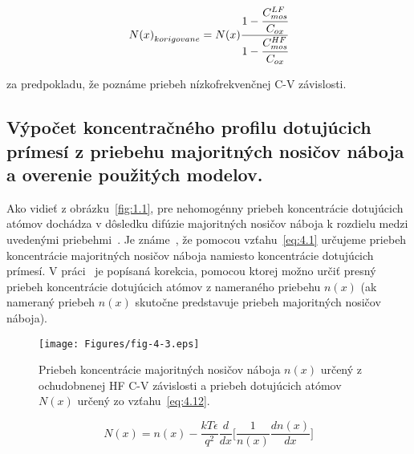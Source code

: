 \begin{equation}\label{eq:4.11}
  {N(x)}_{korigovane} = {N(x)}{\cfrac{1-\cfrac{C_{mos}^{LF}}{C_{ox}}}{1-\cfrac{C_{mos}^{HF}}{C_{ox}}}}
\end{equation}

za predpokladu, že poznáme priebeh nízkofrekvenčnej C-V závislosti.


\subsection[Výpočet koncentračného profilu dotujúcich prímesí z priebehu majoritných nosičov náboja a overenie použitých modelov.]{Výpočet koncentračného profilu dotujúcich prímesí z priebehu majoritných nosičov náboja a overenie použitých modelov.}\label{sec:4.1.4}

Ako vidieť z obrázku~\ref{fig:1.1}, pre nehomogénny priebeh
koncentrácie dotujúcich atómov dochádza v dôsledku difúzie majoritných
nosičov náboja k rozdielu medzi uvedenými priebehmi~\cite{4.16}. Je
známe~\cite{4.17}, že pomocou vzťahu~\ref{eq:4.1} určujeme priebeh
koncentrácie majoritných nosičov náboja namiesto koncentrácie
dotujúcich prímesí. V práci~\cite{4.18} je popísaná korekcia, pomocou
ktorej možno určiť presný priebeh koncentrácie dotujúcich atómov z
nameraného priebehu $n(x)$ (ak nameraný priebeh $n(x)$ skutočne
predstavuje priebeh majoritných nosičov náboja).

\begin{figure}[h!]\centering
  \begin{minipage}[c]{\myfiguresize}
    \begin{center}
      \texttt{[image: Figures/fig-4-3.eps]}
      \caption[Priebeh koncentrácie majoritných nosičov náboja $n(x)$
        určený z ochudobnenej HF C-V závislosti a priebeh dotujúcich
        atómov $N(x)$ určený zo vzťahu~\ref{eq:4.12}]{Priebeh
        koncentrácie majoritných nosičov náboja $n(x)$ určený z
        ochudobnenej HF C-V závislosti a priebeh dotujúcich atómov
        $N(x)$ určený zo vzťahu~\ref{eq:4.12}.}\label{fig:4.3}
    \end{center}
  \end{minipage}
\end{figure}

\begin{equation}\label{eq:4.12}
  N(x) = n(x) - {\frac{kT\epsilon}{q^{2}} {\frac{d}{dx}} {\Bigg[\frac{1}{n(x)}\frac{dn(x)}{dx}\Bigg]}}
\end{equation}

